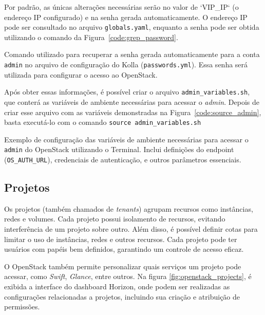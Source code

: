 Por padrão, as únicas alterações necessárias serão no valor de `VIP\_IP` (o endereço IP configurado) e na senha gerada automaticamente. O endereço IP pode ser consultado no arquivo \texttt{globals.yaml}, enquanto a senha pode ser obtida utilizando o comando da Figura~\ref{code:grep_password}.

\begin{listing}[h!]
    \noindent{}  
  \caption{Comando utilizado para recuperar a senha gerada automaticamente para a conta \texttt{admin} no arquivo de configuração do Kolla (\texttt{passwords.yml}). Essa senha será utilizada para configurar o acesso ao OpenStack.}
  \label{code:grep_password}
\end{listing}

Após obter essas informações, é possível criar o arquivo \texttt{admin\_variables.sh}, que conterá as variáveis de ambiente necessárias para acessar o \textit{admin}. Depois de criar esse arquivo com as variáveis demonstradas na Figura~\ref{code:source_admin}, basta executá-lo com o comando \texttt{source admin\_variables.sh}

\begin{listing}[h!]
    \noindent{}  
  \caption{Exemplo de configuração das variáveis de ambiente necessárias para acessar o \texttt{admin} do OpenStack utilizando o Terminal. Inclui definições do endpoint (\texttt{OS\_AUTH\_URL}), credenciais de autenticação, e outros parâmetros essenciais.}
  \label{code:source_admin}
\end{listing}

\subsection{Projetos}
Os projetos (também chamados de \textit{tenants}) agrupam recursos como instâncias, redes e volumes. Cada projeto possui isolamento de recursos, evitando interferência de um projeto sobre outro. Além disso, é possível definir cotas para limitar o uso de instâncias, redes e outros recursos. Cada projeto pode ter usuários com papéis bem definidos, garantindo um controle de acesso eficaz.

O OpenStack também permite personalizar quais serviços um projeto pode acessar, como \textit{Swift}, \textit{Glance}, entre outros. Na figura \ref{fig:openstack_projects}, é exibida a interface do dashboard Horizon, onde podem ser realizadas as configurações relacionadas a projetos, incluindo sua criação e atribuição de permissões.

